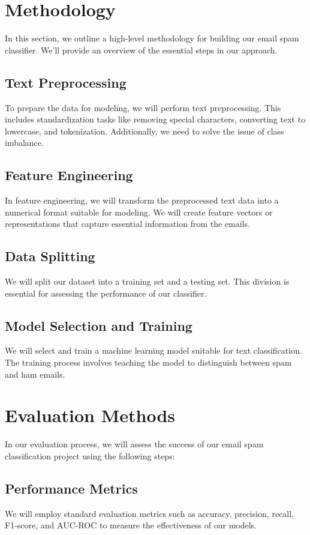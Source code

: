 \documentclass[conference]{IEEEtran}
\begin{document}
\section{Methodology}
In this section, we outline a high-level methodology for building our email spam classifier. We'll provide an overview of the essential steps in our approach.

\subsection{Text Preprocessing}
To prepare the data for modeling, we will perform text preprocessing. This includes standardization tasks like removing special characters, converting text to lowercase, and tokenization. Additionally, we need to solve the issue of class imbalance.

\subsection{Feature Engineering}
In feature engineering, we will transform the preprocessed text data into a numerical format suitable for modeling. We will create feature vectors or representations that capture essential information from the emails.

\subsection{Data Splitting}
We will split our dataset into a training set and a testing set. This division is essential for assessing the performance of our classifier.

\subsection{Model Selection and Training}
We will select and train a machine learning model suitable for text classification. The training process involves teaching the model to distinguish between spam and ham emails.

\section{Evaluation Methods}
In our evaluation process, we will assess the success of our email spam classification project using the following steps:

\subsection{Performance Metrics} We will employ standard evaluation metrics such as accuracy, precision, recall, F1-score, and AUC-ROC to measure the effectiveness of our models.
\end{document}
